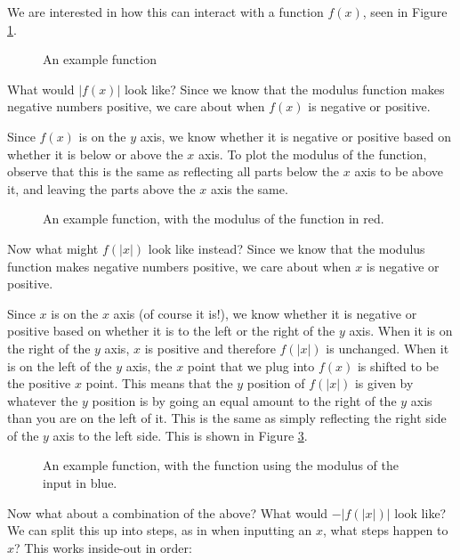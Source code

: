 We are interested in how this can interact with a function $f(x)$, seen in Figure \ref{fig:function-for-modulus}.
\begin{figure}[H]
    \centering
    \caption{An example function}
    \label{fig:function-for-modulus}
\end{figure}

What would $|f(x)|$ look like? Since we know that the modulus function makes negative numbers positive, we care about when $f(x)$ is negative or positive.

Since $f(x)$ is on the $y$ axis, we know whether it is negative or positive based on whether it is below or above the $x$ axis. To plot the modulus of the function, 
observe that this is the same as reflecting all parts below the $x$ axis to be above it, and leaving the parts above the $x$ axis the same. 

\begin{figure}[H]
    \centering
    \caption{An example function, with the modulus of the function in red.}
    \label{fig:mod-function-for-modulus}
\end{figure}

Now what might $f(|x|)$ look like instead? Since we know that the modulus function makes negative numbers positive, we care about when $x$ is negative or positive.

Since $x$ is on the $x$ axis (of course it is!), we know whether it is negative or positive based on whether it is to the left or the right of the $y$ axis. 
When it is on the right of the $y$ axis, $x$ is positive and therefore $f(|x|)$ is unchanged. When it is on the left of the $y$ axis, the $x$ point that we plug into $f(x)$ is shifted to be 
the positive $x$ point. This means that the $y$ position of $f(|x|)$ is given by whatever the $y$ position is by going an equal amount to the right of the $y$ axis than you are on the left of it. 
This is the same as simply reflecting the right side of the $y$ axis to the left side. This is shown in Figure \ref{fig:modx-function-for-modulus}.

\begin{figure}[H]
    \centering
    \caption{An example function, with the function using the modulus of the input in blue.}
    \label{fig:modx-function-for-modulus}
\end{figure}

Now what about a combination of the above? What would $-|f(|x|)|$ look like? We can split this up into steps, as in when inputting an $x$, what steps happen to $x$? 
This works inside-out in order:


